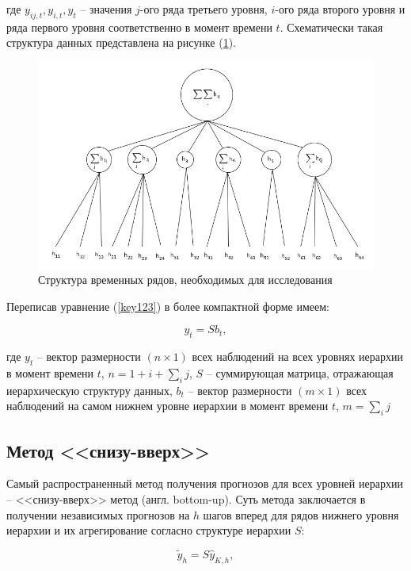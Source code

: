 \documentclass[12pt,a4paper, oneside]{extreport}
\begin{document}
\noindent
где $y_{ij,t}, y_{i,t},  y_{t}  $ -- значения $j$-ого ряда третьего уровня, $i$-ого ряда второго уровня и ряда первого уровня соответственно в момент времени $t$. Схематически такая  структура данных представлена на рисунке (\ref{fig:screenshot51}). 

\newpage

\begin{figure}
	\centering
	\includegraphics[width=0.7\linewidth]{Screenshot51}
	\caption{Структура временных рядов, необходимых для исследования}
	\label{fig:screenshot51}
	

\end{figure}




Переписав уравнение (\ref{key123})  в более компактной форме имеем: 

\begin{equation}\label{key}
y_t  = S b_t ,
\end{equation}

\noindent
где $y_t$ -- вектор размерности $(n \times 1)$ всех наблюдений на всех уровнях иерархии в момент времени $t$, $ n = 1+i+\sum_i j$, $S$  -- суммирующая матрица, отражающая иерархическую структуру данных,  
$ b_t $ -- вектор размерности $(m \times 1)$ всех наблюдений на самом нижнем уровне иерархии в момент времени $t$, $ m =\sum_i j$ 


\subsection{Метод <<снизу-вверх>>}


Самый распространенный метод получения прогнозов для всех уровней иерархии --  <<снизу-вверх>> метод (англ. bottom-up). Суть метода заключается в получении независимых прогнозов на $h$ шагов вперед  для рядов нижнего уровня иерархии  и  их агрегирование согласно структуре иерархии $S$: 

\begin{equation}\label{key}
\tilde{y}_h = S \hat{y}_{K,h}   ,
\end{equation}
\end{document}
